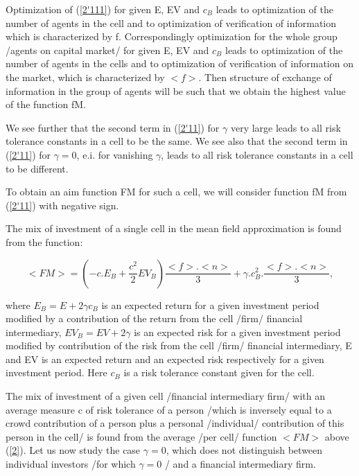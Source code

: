 \documentclass[10pt]{article}
\begin{document}
Optimization of (\ref{2'111}) for given E, EV and $ c_{B} $ leads to optimization of the number of agents in the cell and to optimization of verification of information which is characterized by f. Correspondingly optimization for the whole group /agents on capital market/ for given E, EV and $ c_{B} $ leads to optimization of the number of agents in the cells and to optimization of verification of information on the market, which is characterized by $<f>$.
Then structure of exchange of information in the group of agents will be such that we obtain the highest value of the function fM.

We see further that the second term in (\ref{2'11}) for $\gamma$ very large leads to all risk tolerance constants in a cell to be the same.
We see also that the second term in (\ref{2'11}) for $\gamma = 0$, e.i. for vanishing $\gamma$,
leads to all risk tolerance constants in a cell to be different.

To obtain an aim function FM for such a cell, we will consider function fM from (\ref{2'11}) with negative sign.

The mix of investment of a single cell in the mean field approximation is found from the function:

\begin{equation}
\label{2}
<FM> = (- c.E_{B} + \frac{c^{2}}{2}EV_{B}) \frac{<f>.<n>}{3} + \gamma . c_{B}^{2}. \frac{<f>.<n>}{3},
\end{equation}

where $E_{B} = E + 2 \gamma c_{B}$ is an expected return for a given investment period modified by a contribution of the return from the cell /firm/ financial intermediary, $EV_{B} = EV + 2 \gamma $ is an expected risk for a given investment period modified by contribution of the risk from the cell /firm/ financial intermediary, E and EV is an expected return and an expected risk respectively for a given investment period. Here $c_{B}$ is a risk tolerance constant given for the cell.

The mix of investment of a given cell /financial intermediary firm/ with an average measure c of risk tolerance of a person /which is inversely equal to a crowd contribution of a person plus a personal /individual/ contribution of this person in the cell/ is found from the average  /per cell/ function $<FM>$ above (\ref{2}). Let us now study the case $\gamma = 0$, which does not distinguish between individual investors /for which $\gamma = 0$ / and a financial intermediary firm.
\end{document}

